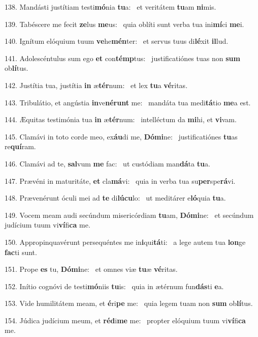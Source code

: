 138. Mandásti justítiam testi\textbf{mó}nia \textbf{tu}a: \ast\  et veritátem \textbf{tu}am \textbf{ni}mis.\

139. Tabéscere me fecit \textbf{ze}lus \textbf{me}us: \ast\  quia oblíti sunt verba tua ini\textbf{mí}ci \textbf{me}i.\

140. Ignítum elóquium tuum \textbf{ve}he\textbf{mén}ter: \ast\  et servus tuus di\textbf{lé}xit \textbf{il}lud.\

141. Adolescéntulus sum ego \textbf{et} con\textbf{témp}tus: \ast\  justificatiónes tuas non \textbf{sum} ob\textbf{lí}tus.\

142. Justítia tua, justítia \textbf{in} æ\textbf{tér}num: \ast\  et lex \textbf{tu}a \textbf{vé}ritas.\

143. Tribulátio, et angústia \textbf{in}ve\textbf{né}\textbf{runt} me: \ast\  mandáta tua medi\textbf{tá}tio \textbf{me}a est.\

144. Æquitas testimónia tua \textbf{in} æ\textbf{tér}num: \ast\  intelléctum da \textbf{mi}hi, et \textbf{vi}vam.\

145. Clamávi in toto corde meo, ex\textbf{áu}di me, \textbf{Dó}\textbf{mi}ne: \ast\  justificatiónes \textbf{tu}as re\textbf{quí}ram.\

146. Clamávi ad te, \textbf{sal}vum \textbf{me} fac: \ast\  ut custódiam man\textbf{dá}ta \textbf{tu}a.\

147. Prævéni in maturitáte, \textbf{et} cla\textbf{má}vi: \ast\  quia in verba tua su\textbf{per}spe\textbf{rá}vi.\

148. Prævenérunt óculi mei ad \textbf{te} di\textbf{lú}\textbf{cu}lo: \ast\  ut meditárer e\textbf{ló}quia \textbf{tu}a.\

149. Vocem meam audi secúndum misericórdiam \textbf{tu}am, \textbf{Dó}\textbf{mi}ne: \ast\  et secúndum judícium tuum vi\textbf{ví}fi\textbf{ca} me.\

150. Appropinquavérunt persequéntes me in\textbf{i}qui\textbf{tá}ti: \ast\  a lege autem tua \textbf{lon}ge \textbf{fac}ti sunt.\

151. Prope \textbf{es} tu, \textbf{Dó}\textbf{mi}ne: \ast\  et omnes viæ \textbf{tu}æ \textbf{vé}ritas.\

152. Inítio cognóvi de testi\textbf{mó}niis \textbf{tu}is: \ast\  quia in ætérnum fun\textbf{dás}ti \textbf{e}a.\

153. Vide humilitátem meam, et \textbf{é}ri\textbf{pe} me: \ast\  quia legem tuam non \textbf{sum} ob\textbf{lí}tus.\

154. Júdica judícium meum, et \textbf{réd}i\textbf{me} me: \ast\  propter elóquium tuum vi\textbf{ví}fi\textbf{ca} me.\

